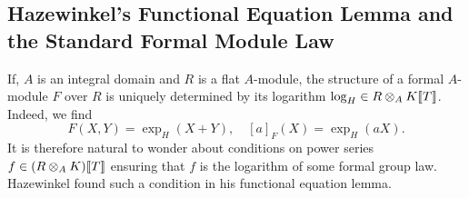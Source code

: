 \documentclass[../main.tex]{subfiles}
\begin{document}

\subsection{Hazewinkel's Functional Equation Lemma and the Standard Formal Module Law} %
\label{sub:Hazewinkels FuncEq and the Standard Formal Module}
If, $A$ is an integral domain and $R$ is a flat $A$-module, the structure of a formal
$A$-module $F$ over $R$ is uniquely determined by its logarithm $\log_H
\in R \otimes_A K \llbracket T \rrbracket$. Indeed, we find
\begin{equation*}
  F(X,Y) = \exp_H(X+Y), \quad [a]_F(X) = \exp_H(a X).
\end{equation*}
It is therefore natural to wonder about conditions on power series $f \in
(R\otimes_A K) \llbracket T \rrbracket$ ensuring that $f$ is the logarithm of some
formal group law. Hazewinkel found such a condition in his functional equation
lemma.
\end{document}
